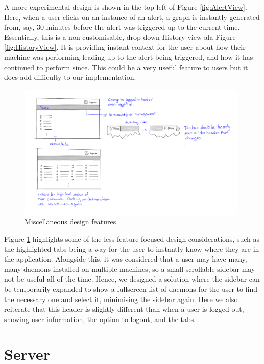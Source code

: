 \documentclass{l3proj}
\begin{document}
A more experimental design is shown in the top-left of Figure \ref{fig:AlertView}. Here, when a user clicks on an instance of an alert, a graph is instantly generated from, say, 30 minutes before the alert was triggered up to the current time. Essentially, this is a non-customisable, drop-down History view ala Figure \ref{fig:HistoryView}. It is providing instant context for the user about how their machine was performing leading up to the alert being triggered, and how it has continued to perform since. This could be a very useful feature to users but it does add difficulty to our implementation.

\begin{figure}[H]
\centering
\includegraphics[width=110mm]{Concept_Designs/Misc.png}
\caption{Miscellaneous design features}
\label{fig:MiscDesign}
\end{figure}

Figure \ref{fig:MiscDesign} highlights some of the less feature-focused design considerations, such as the highlighted tabs being a way for the user to instantly know where they are in the application. Alongside this, it was considered that a user may have many, many daemons installed on multiple machines, so a small scrollable sidebar may not be useful all of the time. Hence, we designed a solution where the sidebar can be temporarily expanded to show a fullscreen list of daemons for the user to find the necessary one and select it, minimising the sidebar again. Here we also reiterate that this header is slightly different than when a user is logged out, showing user information, the option to logout, and the tabs.


\section{Server}
\end{document}
